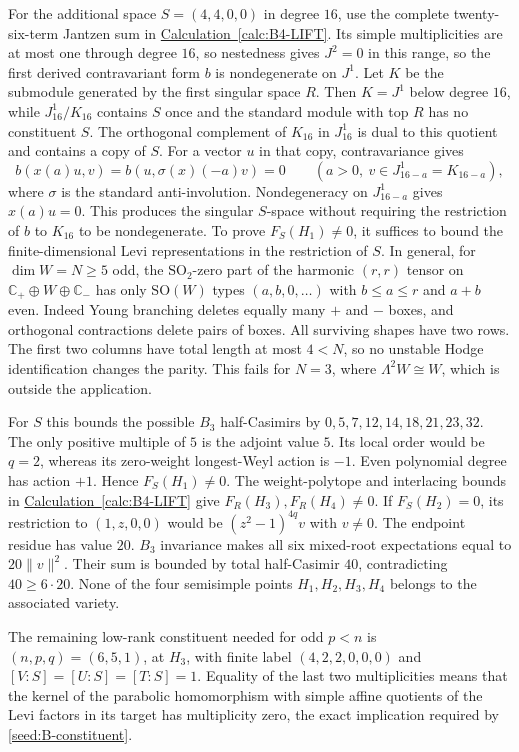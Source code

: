 \documentclass[11pt,a4paper]{amsart}
\numberwithin{equation}{section}
\theoremstyle{definition}
\theoremstyle{remark}
\newcommand{\C}{\mathbb C}
\begin{document}
For the additional space $S=(4,4,0,0)$ in degree $16$, use the
complete twenty-six-term Jantzen sum in
\hyperref[calc:B4-LIFT]{Calculation~\ref*{calc:B4-LIFT}}.
Its simple multiplicities are at most one through degree $16$,
so nestedness gives $J^2=0$ in this range,
so the first derived contravariant form $b$ is nondegenerate on $J^1$.
Let $K$ be the submodule generated by the first singular space $R$.
Then $K=J^1$ below degree $16$, while $J^1_{16}/K_{16}$ contains $S$
once and the standard module with top $R$ has no constituent $S$.
The orthogonal complement of $K_{16}$ in $J^1_{16}$ is dual to this
quotient and contains a copy of $S$. For a vector $u$ in that copy,
contravariance gives
$$
 b(x(a)u,v)=b(u,\sigma(x)(-a)v)=0
 \qquad(a>0,\ v\in J^1_{16-a}=K_{16-a}),
$$
where $\sigma$ is the standard anti-involution. Nondegeneracy on
$J^1_{16-a}$ gives $x(a)u=0$. This produces the singular $S$-space
without requiring the restriction of $b$ to $K_{16}$ to be nondegenerate.
To prove $F_S(H_1)\ne0$, it suffices to bound the finite-dimensional
Levi representations in the restriction of $S$. In general, for
$\dim W=N\ge5$ odd, the $\mathrm{SO}_2$-zero part of the harmonic
$(r,r)$ tensor on $\C_+\oplus W\oplus\C_-$ has only $\mathrm{SO}(W)$
types $(a,b,0,\ldots)$ with $b\le a\le r$ and $a+b$ even.
Indeed Young branching deletes equally many $+$ and $-$ boxes, and
orthogonal contractions delete pairs of boxes. All surviving shapes have
two rows. The first two columns have total length at most $4<N$, so
no unstable Hodge identification changes the parity. This fails for
$N=3$, where $\Lambda^2W\cong W$, which is outside the application.

For $S$ this bounds the possible $B_3$ half-Casimirs by
$
 0,5,7,12,14,18,21,23,32.
$
The only positive multiple of $5$ is the adjoint value $5$. Its local
order would be $q=2$, whereas its zero-weight longest-Weyl action is
$-1$. Even polynomial degree has action $+1$. Hence $F_S(H_1)\ne0$.
The weight-polytope and interlacing bounds in \hyperref[calc:B4-LIFT]{Calculation~\ref*{calc:B4-LIFT}}
give $F_R(H_3),F_R(H_4)\ne0$. If $F_S(H_2)=0$, its restriction to
$(1,z,0,0)$ would be $(z^2-1)^{4q}v$ with $v\ne0$.
The endpoint residue has value $20$. $B_3$ invariance makes all six
mixed-root expectations equal to $20\|v\|^2$. Their sum is bounded
by total half-Casimir $40$, contradicting $40\ge6\cdot20$.
None of the four semisimple points $H_1,H_2,H_3,H_4$ belongs to the
associated variety.

The remaining low-rank constituent needed for odd $p<n$ is
$(n,p,q)=(6,5,1)$, at $H_3$, with finite label $(4,2,2,0,0,0)$ and
$[V:S]=[U:S]=[T:S]=1$. Equality of the last two multiplicities means
that the kernel of the parabolic homomorphism with simple affine
quotients of the Levi factors in its target has multiplicity zero, the exact implication
required by \cref{seed:B-constituent}.
\end{document}
